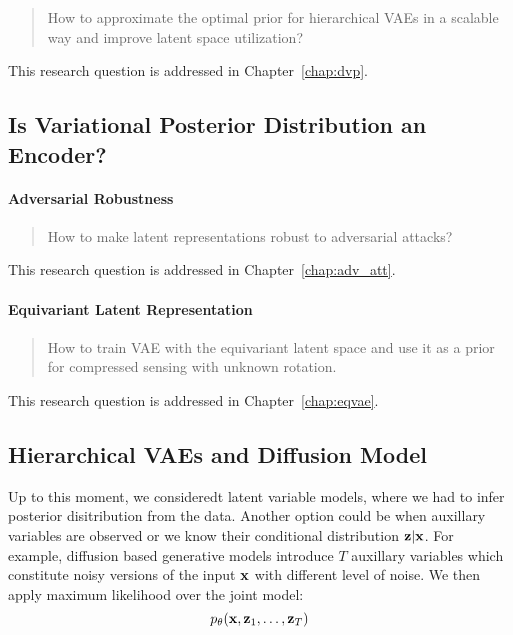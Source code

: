 \begin{quote}
	How  to approximate the optimal prior for hierarchical VAEs in a scalable way and improve latent space utilization?
\end{quote}
This research question is addressed in Chapter~\ref{chap:dvp}.

\subsection{Is Variational Posterior Distribution an Encoder?}


\paragraph{Adversarial Robustness}
\begin{quote}
	How  to make latent representations robust to adversarial attacks?
\end{quote}
This research question is addressed in Chapter~\ref{chap:adv_att}.

\paragraph{Equivariant Latent Representation}

\begin{quote}
	How  to train VAE with the equivariant latent space and use it as a prior for compressed sensing with unknown rotation.
\end{quote}
This research question is addressed in Chapter~\ref{chap:eqvae}.


\subsection{Hierarchical VAEs and Diffusion Model}
Up to this moment, we consideredt latent variable models, where we had to infer posterior disitribution from the data. Another option could be when auxillary variables are observed or we know their conditional distribution ${\mathbf{z}}|{\mathbf{x}}$. For example, diffusion based generative models introduce $T$ auxillary variables which constitute noisy versions of the input ${\mathbf{x}}$ with different level of noise. We then apply maximum likelihood over the joint model:
\begin{equation}
p_{\theta}({\mathbf{x}}, {\mathbf{z}}_1, \dots, {\mathbf{z}}_T)
\end{equation}

